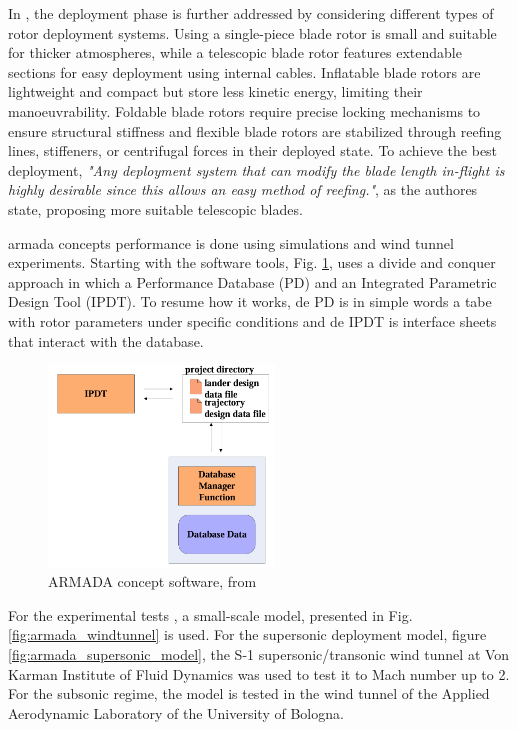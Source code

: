 In \cite{noauthor_armada_nodate}, the deployment phase is further addressed by considering different types of rotor deployment systems. Using a single-piece blade rotor is small and suitable for thicker atmospheres, while a telescopic blade rotor features extendable sections for easy deployment using internal cables. Inflatable blade rotors are lightweight and compact but store less kinetic energy, limiting their manoeuvrability. Foldable blade rotors require precise locking mechanisms to ensure structural stiffness and flexible blade rotors are stabilized through reefing lines, stiffeners, or centrifugal forces in their deployed state. To achieve the best deployment, \textit{"Any deployment system that can modify the blade length in-flight is highly desirable since this allows an easy method of reefing."}, as the authores state, proposing more suitable telescopic blades.

\gls{armada} \cite{noauthor_armada_nodate} concepts performance is done using simulations and wind tunnel experiments. Starting with the software tools, Fig. \ref{fig:armada_software}, uses a divide and conquer approach in which a Performance Database (PD) and an Integrated Parametric Design  Tool (IPDT). To resume how it works, de PD is in simple words a tabe with rotor parameters under specific conditions and de IPDT is interface sheets that interact with the database.

\begin{figure}[!htb]
    \centering
    \includegraphics[width=6cm]{Figures/introduction/armada_software.png}
    \caption{ARMADA concept software, from \cite{noauthor_armada_nodate}}
    \label{fig:armada_software}
\end{figure}

For the experimental tests \cite{noauthor_armada_nodate}, a small-scale model, presented in Fig. \ref{fig:armada_windtunnel} is used. For the supersonic deployment model, figure \ref{fig:armada_supersonic_model}, the S-1 supersonic/transonic wind tunnel 
at Von Karman Institute of Fluid Dynamics was used to test it to Mach number up to 2. For the subsonic regime, the model is tested in the wind tunnel of the Applied Aerodynamic Laboratory of the University of Bologna.

